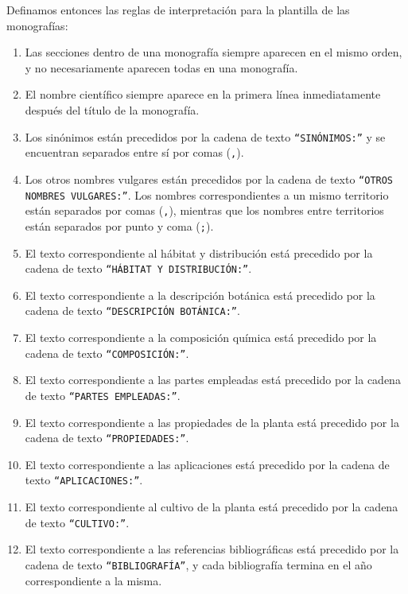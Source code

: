 Definamos entonces las reglas de interpretación para la plantilla de las monografías:
\begin{enumerate}
    \item Las secciones dentro de una monografía siempre aparecen en el mismo orden, y no necesariamente aparecen todas en una monografía.
    \item El nombre científico siempre aparece en la primera línea inmediatamente después del título de la monografía.
    \item Los sinónimos están precedidos por la cadena de texto \texttt{``SINÓNIMOS:''} y se encuentran separados entre sí por comas (\texttt{,}).
    \item Los otros nombres vulgares están precedidos por la cadena de texto \texttt{``OTROS NOMBRES VULGARES:''}. Los nombres correspondientes a un mismo territorio están separados por comas (\texttt{,}), mientras que los nombres entre territorios están separados por punto y coma (\texttt{;}).
    \item El texto correspondiente al hábitat y distribución está precedido por la cadena de texto \texttt{``HÁBITAT Y DISTRIBUCIÓN:''}.
    \item El texto correspondiente a la descripción botánica está precedido por la cadena de texto \texttt{``DESCRIPCIÓN BOTÁNICA:''}.
    \item El texto correspondiente a la composición química está precedido por la cadena de texto \texttt{``COMPOSICIÓN:''}.
    \item El texto correspondiente a las partes empleadas está precedido por la cadena de texto \texttt{``PARTES EMPLEADAS:''}.
    \item El texto correspondiente a las propiedades de la planta está precedido por la cadena de texto \texttt{``PROPIEDADES:''}.
    \item El texto correspondiente a las aplicaciones está precedido por la cadena de texto \texttt{``APLICACIONES:''}.
    \item El texto correspondiente al cultivo de la planta está precedido por la cadena de texto \texttt{``CULTIVO:''}.
    \item El texto correspondiente a las referencias bibliográficas está precedido por la cadena de texto \texttt{``BIBLIOGRAFÍA''}, y cada bibliografía termina en el año correspondiente a la misma.
\end{enumerate}

